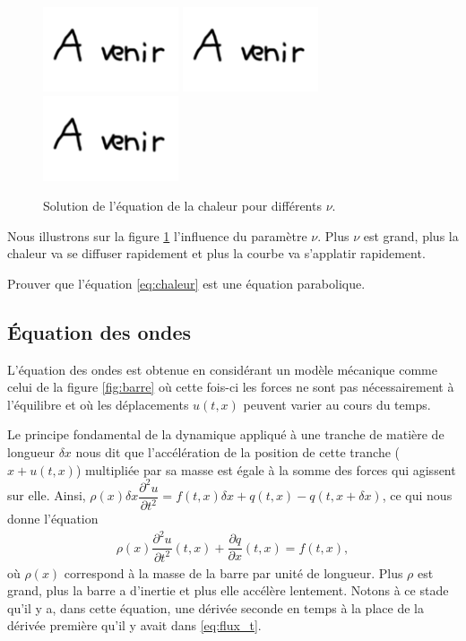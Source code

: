 \documentclass[12pt,a4paper,twoside]{article}
\begin{document}
\begin{figure}[h]
  \centering
  \includegraphics[width = 4cm]{Figures/A_venir.png}
  \includegraphics[width = 4cm]{Figures/A_venir.png}
  \includegraphics[width = 4cm]{Figures/A_venir.png}
  \caption{Solution de l'\'equation de la chaleur
  pour diff\'erents $\nu$.}
  \label{fig:chaleur_nu}
\end{figure}


Nous illustrons sur la figure \ref{fig:chaleur_nu} l'influence du param\`etre $\nu$.
Plus $\nu$ est grand, plus la chaleur va se diffuser rapidement et plus 
la courbe va s'applatir rapidement.

\begin{exercise}
  Prouver que l'\'equation \eqref{eq:chaleur} est une \'equation parabolique.
\end{exercise}


\subsection{\'Equation des ondes}

L'\'equation des ondes est obtenue en consid\'erant un mod\`ele m\'ecanique
comme celui de la figure \ref{fig:barre} o\`u cette fois-ci les forces ne
sont pas n\'ecessairement \`a l'\'equilibre et o\`u les d\'eplacements
$u(t,x)$ peuvent varier au cours du temps.

Le principe fondamental de la dynamique appliqu\'e \`a une tranche de mati\`ere
de longueur $\delta x$ nous dit que l'acc\'el\'eration de la position de cette tranche
($x+u(t,x)$) multipli\'ee par sa masse est \'egale \`a la somme des forces qui
agissent sur elle.
Ainsi, $\rho(x) \delta x \dfrac{\partial^2 u}{\partial t^2} = 
f(t,x) \delta x + q(t,x) - q(t, x + \delta x)$, ce qui nous donne l'\'equation
\begin{align}
  \label{eq:barre_t}
  \rho(x) \dfrac{\partial^2 u}{\partial t^2}(t,x) + \dfrac{\partial q}{\partial x}(t,x) = f(t,x) ,
\end{align}
o\`u $\rho(x)$ correspond \`a la masse de la barre par unit\'e de longueur.
Plus $\rho$ est grand, plus la barre a d'inertie et plus elle acc\'el\`ere lentement.
Notons \`a ce stade qu'il y a, dans cette \'equation, une d\'eriv\'ee seconde en temps
\`a la place de la d\'eriv\'ee premi\`ere qu'il y avait dans \eqref{eq:flux_t}.
\end{document}
